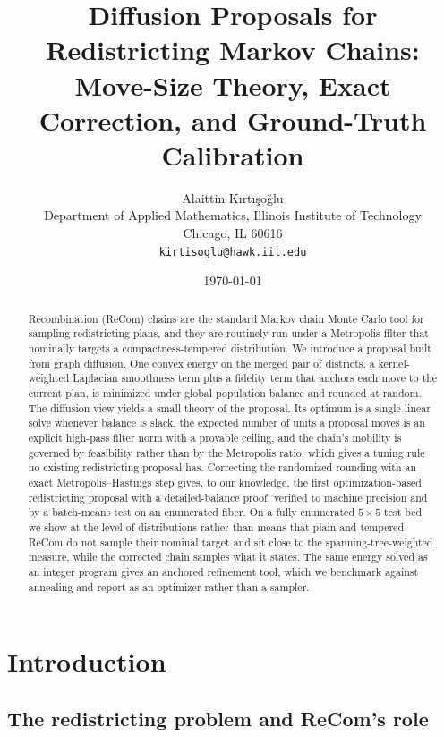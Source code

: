 \documentclass[11pt]{article}
\title{Diffusion Proposals for Redistricting Markov Chains:\\
       Move-Size Theory, Exact Correction, and Ground-Truth Calibration}
\author{Alaittin K\i rt\i \c{s}o\u{g}lu \\
        \small Department of Applied Mathematics, Illinois Institute of Technology \\
        \small Chicago, IL 60616 \\
        \small \texttt{kirtisoglu@hawk.iit.edu}}
\date{\today}
\begin{document}
\maketitle

\begin{abstract}
Recombination (ReCom) chains are the standard Markov chain Monte
Carlo tool for sampling redistricting plans, and they are routinely
run under a Metropolis filter that nominally targets a
compactness-tempered distribution. We introduce a proposal built from
graph diffusion. One convex energy on the merged pair of districts, a
kernel-weighted Laplacian smoothness term plus a fidelity term that
anchors each move to the current plan, is minimized under global
population balance and rounded at random. The diffusion view yields a
small theory of the proposal. Its optimum is a single linear solve
whenever balance is slack, the expected number of units a proposal
moves is an explicit high-pass filter norm with a provable ceiling,
and the chain's mobility is governed by feasibility rather than by the
Metropolis ratio, which gives a tuning rule no existing redistricting
proposal has. Correcting the randomized rounding with an exact
Metropolis--Hastings step gives, to our knowledge, the first
optimization-based redistricting proposal with a detailed-balance
proof, verified to machine precision and by a batch-means test on an
enumerated fiber. On a fully enumerated $5 \times 5$ test bed we show
at the level of distributions rather than means that plain and
tempered ReCom do not sample their nominal target and sit close to
the spanning-tree-weighted measure, while the corrected chain samples
what it states. The same energy solved as an integer program gives an
anchored refinement tool, which we benchmark against annealing and
report as an optimizer rather than a sampler.
\end{abstract}

\section{Introduction}\label{sec:intro}

\subsection{The redistricting problem and ReCom's role}\label{sec:intro-problem}
\end{document}

